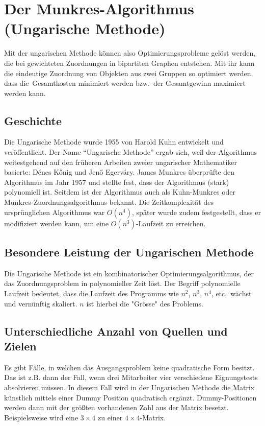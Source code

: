 %
%
%
\section{Der Munkres-Algorithmus (Ungarische Methode)
\label{munkres:section:teil3}}

Mit der ungarischen Methode können also Optimierungsprobleme gelöst
werden, die bei gewichteten Zuordnungen in bipartiten Graphen entstehen.
Mit ihr kann die eindeutige Zuordnung von Objekten aus zwei Gruppen so
optimiert werden, dass die Gesamtkosten minimiert werden bzw.~der
Gesamtgewinn maximiert werden kann. 

\subsection{Geschichte
\label{munkres:subsection:malorum}}
Die Ungarische Methode wurde 1955 von Harold Kuhn entwickelt und veröffentlicht.
Der Name ``Ungarische Methode'' ergab sich, weil der Algorithmus
weitestgehend auf den früheren Arbeiten zweier ungarischer Mathematiker
basierte: Dénes Kőnig und Jenő Egerváry.
James Munkres überprüfte den Algorithmus im Jahr 1957 und stellte fest,
dass der Algorithmus (stark) polynomiell ist.
Seitdem ist der Algorithmus auch als Kuhn-Munkres oder
Munkres-Zuordnungsalgorithmus bekannt.
Die Zeitkomplexität des ursprünglichen Algorithmus war $O(n^4)$,
später wurde zudem festgestellt, dass er modifiziert werden kann,
um eine  $O(n^3)$-Laufzeit zu erreichen.

\subsection{Besondere Leistung der Ungarischen Methode
\label{munkres:subsection:malorum}}
Die Ungarische Methode ist ein kombinatorischer Optimierungsalgorithmus, der das Zuordnungsproblem
in polynomieller Zeit löst.
Der Begriff polynomielle Laufzeit bedeutet, dass die Laufzeit des Programms
wie $n^2$, $n^3$, $n^4$, etc.~wächst und vernünftig skaliert. $n$ ist hierbei die "Grösse" des Problems.

\subsection{Unterschiedliche Anzahl von Quellen und Zielen
\label{munkres:subsection:malorum}}
Es gibt Fälle, in welchen das Ausgangsproblem keine quadratische Form besitzt. Das ist z.B. dann der Fall, wenn drei Mitarbeiter vier verschiedene Eignungstests absolvieren müssen. In diesem Fall wird in der Ungarischen Methode die Matrix künstlich mittels einer Dummy Position quadratisch ergänzt. Dummy-Positionen werden dann mit der größten vorhandenen Zahl aus der Matrix besetzt. Beispielsweise wird eine $3\times 4$ zu einer $4\times 4$-Matrix.


